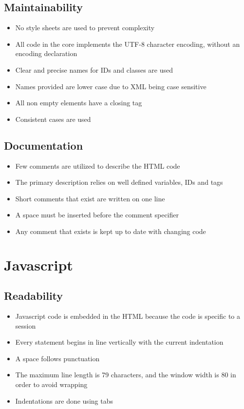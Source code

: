 \documentclass[11pt, a4paper]{article}
\begin{document}
\subsection{Maintainability}
\begin{itemize}
	\item No style sheets are used to prevent complexity
	\item All code in the core implements the UTF-8 character encoding, without an encoding declaration
	\item  Clear and precise names for IDs and classes are used
	\item Names provided are lower case due to XML being case sensitive
	\item All non empty elements have a closing tag
	\item Consistent cases are used 
\end{itemize}
\subsection{Documentation}
\begin{itemize}
	\item Few comments are utilized to describe the HTML code
	\item The primary description relies on well defined variables, IDs and tags
	\item Short comments that exist are written on one line
	\item A space must be inserted before the comment specifier
	\item Any comment that exists is kept up to date with changing code 
\end{itemize}
\section{Javascript}
\subsection{Readability}
\begin{itemize}
	\item Javascript code is embedded in the HTML because the code is specific to a session
	\item Every statement begins in line vertically with the current indentation
	\item A space follows punctuation
	\item The maximum line length is 79 characters, and the window width is 80 in order to avoid wrapping
	\item Indentations are done using tabs

\end{itemize}
\end{document}
